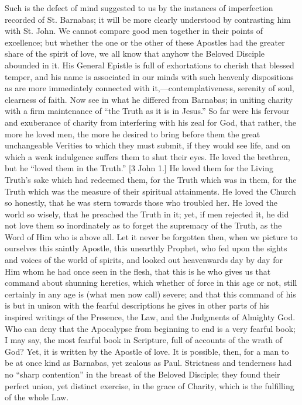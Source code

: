 Such is the defect of mind suggested to us by the instances of
imperfection recorded of St. Barnabas; it will be more clearly
understood by contrasting him with St. John. We cannot compare good men
together in their points of excellence; but whether the one or the other
of these Apostles had the greater share of the spirit of love, we all
know that anyhow the Beloved Disciple abounded in it. His General
Epistle is full of exhortations to cherish that blessed temper, and his
name is associated in our minds with such heavenly dispositions as are
more immediately connected with it,—contemplativeness, serenity of
soul, clearness of faith. Now see in what he differed from Barnabas; in
uniting charity with a firm maintenance of ``the Truth as it is in
Jesus.'' So far were his fervour and exuberance of charity from
interfering with his zeal for God, that rather, the more he loved men,
the more he desired to bring before them the great unchangeable Verities
to which they must submit, if they would see life, and on which a weak
indulgence suffers them to shut their eyes. He loved the brethren, but
he ``loved them in the Truth.'' [3 John 1.] He loved them for
the Living Truth's sake which had redeemed them, for the Truth which was
in them, for the Truth which was the measure of their spiritual
attainments. He loved the Church so honestly, that he was stern towards
those who troubled her. He loved the world so wisely, that he preached
the Truth in it; yet, if men rejected it, he did not love them so
inordinately as to forget the supremacy of the Truth, as the Word of Him
who is above all. Let it never be forgotten then, when we picture to
ourselves this saintly Apostle, this unearthly Prophet, who fed upon the
sights and voices of the world of spirits, and looked out heavenwards
day by day for Him whom he had once seen in the flesh, that this is he
who gives us that command about shunning heretics, which whether of
force in this age or not, still certainly in any age is (what men now
call) severe; and that this command of his is but in unison with the
fearful descriptions he gives in other parts of his inspired writings of
the Presence, the Law, and the Judgments of Almighty God. Who can deny
that the Apocalypse from beginning to end is a very fearful book; I may
say, the most fearful book in Scripture, full of accounts of the wrath
of God? Yet, it is written by the Apostle of love. It is possible, then,
for a man to be at once kind as Barnabas, yet zealous as Paul.
Strictness and tenderness had no ``sharp contention'' in the
breast of the Beloved Disciple; they found their perfect union, yet
distinct exercise, in the grace of Charity, which is the fulfilling of
the whole Law.

